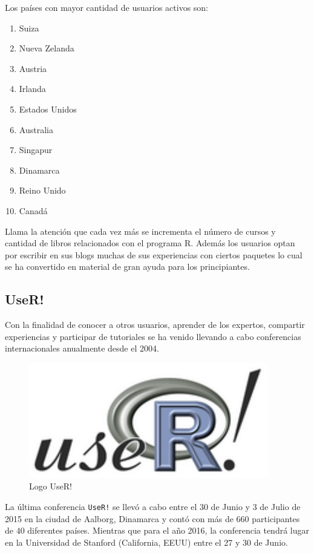 \documentclass[11pt,a4paper,oneside]{book}\usepackage[]{graphicx}\usepackage[]{color}
\begin{document}
Los países con mayor cantidad de usuarios activos son:
\begin{multicols}{2}
\begin{enumerate}
   \item Suiza
   \item Nueva Zelanda
   \item Austria
   \item Irlanda
   \item Estados Unidos
   \item Australia
   \item Singapur
   \item Dinamarca
   \item Reino Unido
   \item Canadá
\end{enumerate}
\end{multicols}

Llama la atención que cada vez más se incrementa el número de cursos y cantidad de libros relacionados con el programa R. Además los usuarios optan por escribir en sus blogs muchas de sus experiencias con ciertos paquetes lo cual se ha convertido en material de gran ayuda para los principiantes.

\subsection{UseR!}

Con la finalidad de conocer a otros usuarios, aprender de los expertos, compartir experiencias y participar de tutoriales se ha venido llevando a cabo conferencias internacionales anualmente desde el 2004.

\begin{figure}[H]
\centering
\includegraphics[scale=.6]{figuras/useR.pdf}
\caption{Logo UseR!}
\end{figure}

La última conferencia \texttt{UseR!} se llevó a cabo entre el 30 de Junio y 3 de Julio de 2015 en la ciudad de Aalborg, Dinamarca y contó con más de $660$ participantes de $40$ diferentes países. Mientras que para el año 2016, la conferencia tendrá lugar en la Universidad de Stanford (California, EEUU) entre el 27 y 30 de Junio.\newline
\end{document}
